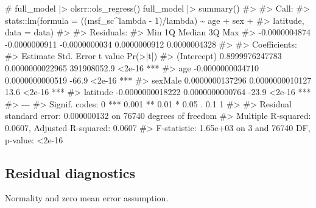\documentclass[
  12pt,
  a4paper,
  oneside]{tesesusp}
\newenvironment{Shaded}{\begin{snugshade}}{\end{snugshade}}
\newcommand{\CommentTok}[1]{\textcolor[rgb]{0.37,0.37,0.37}{#1}}
\newcommand{\FunctionTok}[1]{\textcolor[rgb]{0.28,0.35,0.67}{#1}}
\newcommand{\NormalTok}[1]{\textcolor[rgb]{0.00,0.23,0.31}{#1}}
\newcommand{\SpecialCharTok}[1]{\textcolor[rgb]{0.37,0.37,0.37}{#1}}
\begin{document}
\begin{Shaded}
\begin{Highlighting}[numbers=left,,]
\CommentTok{\# full\_model |\textgreater{} olsrr::ols\_regress()}
\NormalTok{full\_model }\SpecialCharTok{|\textgreater{}} \FunctionTok{summary}\NormalTok{()}
\CommentTok{\#\textgreater{} }
\CommentTok{\#\textgreater{} Call:}
\CommentTok{\#\textgreater{} stats::lm(formula = ((msf\_sc\^{}lambda {-} 1)/lambda) \textasciitilde{} age + sex + }
\CommentTok{\#\textgreater{}     latitude, data = data)}
\CommentTok{\#\textgreater{} }
\CommentTok{\#\textgreater{} Residuals:}
\CommentTok{\#\textgreater{}           Min            1Q        Median            3Q           Max }
\CommentTok{\#\textgreater{} {-}0.0000004874 {-}0.0000000911 {-}0.0000000034  0.0000000912  0.0000004328 }
\CommentTok{\#\textgreater{} }
\CommentTok{\#\textgreater{} Coefficients:}
\CommentTok{\#\textgreater{}                     Estimate       Std. Error     t value Pr(\textgreater{}|t|)    }
\CommentTok{\#\textgreater{} (Intercept)  0.8999976247783  0.0000000022965 391908052.9   \textless{}2e{-}16 ***}
\CommentTok{\#\textgreater{} age         {-}0.0000000034710  0.0000000000519       {-}66.9   \textless{}2e{-}16 ***}
\CommentTok{\#\textgreater{} sexMale      0.0000000137296  0.0000000010127        13.6   \textless{}2e{-}16 ***}
\CommentTok{\#\textgreater{} latitude    {-}0.0000000018222  0.0000000000764       {-}23.9   \textless{}2e{-}16 ***}
\CommentTok{\#\textgreater{} {-}{-}{-}}
\CommentTok{\#\textgreater{} Signif. codes:  0 \textquotesingle{}***\textquotesingle{} 0.001 \textquotesingle{}**\textquotesingle{} 0.01 \textquotesingle{}*\textquotesingle{} 0.05 \textquotesingle{}.\textquotesingle{} 0.1 \textquotesingle{} \textquotesingle{} 1}
\CommentTok{\#\textgreater{} }
\CommentTok{\#\textgreater{} Residual standard error: 0.000000132 on 76740 degrees of freedom}
\CommentTok{\#\textgreater{} Multiple R{-}squared:  0.0607, Adjusted R{-}squared:  0.0607 }
\CommentTok{\#\textgreater{} F{-}statistic: 1.65e+03 on 3 and 76740 DF,  p{-}value: \textless{}2e{-}16}
\end{Highlighting}
\end{Shaded}

\hypertarget{residual-diagnostics-1}{%
\subsection{Residual diagnostics}\label{residual-diagnostics-1}}

Normality and zero mean error assumption.
\end{document}
